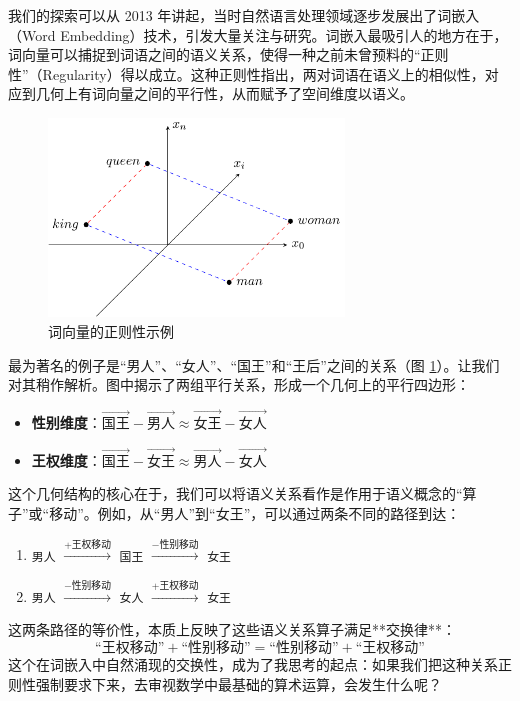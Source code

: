 \documentclass[a4paper,12pt]{book}
\numberwithin{problem}{section}
\numberwithin{definition}{section}
\numberwithin{lemma}{section}
\numberwithin{proposition}{section}
\numberwithin{theorem}{section}
\numberwithin{grammar}{section}
\numberwithin{program}{section}
\numberwithin{convention}{section}
\numberwithin{corollary}{section}
\begin{document}
我们的探索可以从 2013 年讲起，当时自然语言处理领域逐步发展出了词嵌入（Word Embedding）技术，引发大量关注与研究。词嵌入最吸引人的地方在于，词向量可以捕捉到词语之间的语义关系，使得一种之前未曾预料的“正则性”（Regularity）得以成立。这种正则性指出，两对词语在语义上的相似性，对应到几何上有词向量之间的平行性，从而赋予了空间维度以语义。

\begin{figure}[ht]
    \centering
    \includegraphics[width=0.7\textwidth]{../images/wordembedding} %
    \caption{词向量的正则性示例}
    \label{fig:word_embedding}
\end{figure}

最为著名的例子是“男人”、“女人”、“国王”和“王后”之间的关系（图 \ref{fig:word_embedding}）。让我们对其稍作解析。图中揭示了两组平行关系，形成一个几何上的平行四边形：
\begin{itemize}
    \item \textbf{性别维度}：$\vec{国王} - \vec{男人} \approx \vec{女王} - \vec{女人}$
    \item \textbf{王权维度}：$\vec{国王} - \vec{女王} \approx \vec{男人} - \vec{女人}$
\end{itemize}
这个几何结构的核心在于，我们可以将语义关系看作是作用于语义概念的“算子”或“移动”。例如，从“男人”到“女王”，可以通过两条不同的路径到达：
\begin{enumerate}
    \item \texttt{男人} $\xrightarrow{+\text{王权移动}}$ \texttt{国王} $\xrightarrow{-\text{性别移动}}$ \texttt{女王}
    \item \texttt{男人} $\xrightarrow{-\text{性别移动}}$ \texttt{女人} $\xrightarrow{+\text{王权移动}}$ \texttt{女王}
\end{enumerate}
这两条路径的等价性，本质上反映了这些语义关系算子满足**交换律**：
\[
\text{“王权移动”} + \text{“性别移动”} = \text{“性别移动”} + \text{“王权移动”}
\]
这个在词嵌入中自然涌现的交换性，成为了我思考的起点：如果我们把这种关系正则性强制要求下来，去审视数学中最基础的算术运算，会发生什么呢？
\end{document}
